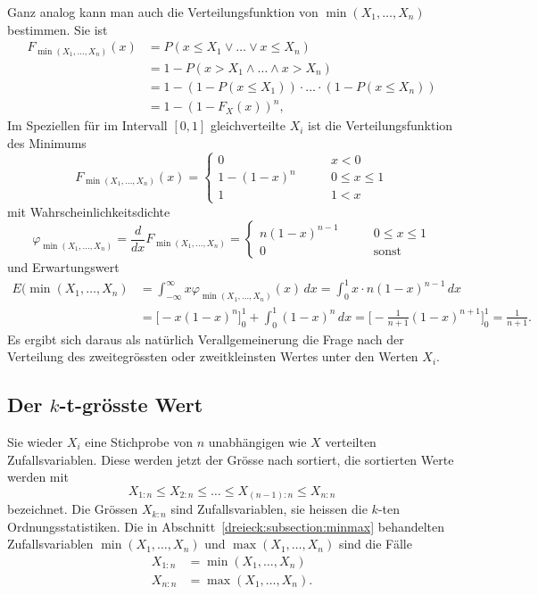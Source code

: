 Ganz analog kann man auch die Verteilungsfunktion von
$\operatorname{min}(X_1,\dots,X_n)$ bestimmen.
Sie ist
\begin{align*}
F_{\operatorname{min}(X_1,\dots,X_n)}(x)
&=
P(x\le X_1\vee \dots \vee x\le X_n)
\\
&=
1-
P(x > X_1\wedge \dots \wedge x > X_n)
\\
&=
1-
(1-P(x\le X_1)) \cdot\ldots\cdot (1-P(x\le X_n))
\\
&=
1-(1-F_X(x))^n,
\end{align*}
Im Speziellen für im Intervall $[0,1]$ gleichverteilte $X_i$ ist die
Verteilungsfunktion des Minimums
\[
F_{\operatorname{min}(X_1,\dots,X_n)}(x)
=
\begin{cases}
0        &\qquad x<0        \\
1-(1-x)^n&\qquad 0\le x\le 1\\
1        &\qquad 1 < x
\end{cases}
\]
mit Wahrscheinlichkeitsdichte
\[
\varphi_{\operatorname{min}(X_1,\dots,X_n)}
=
\frac{d}{dx}
F_{\operatorname{min}(X_1,\dots,X_n)}
=
\begin{cases}
n(1-x)^{n-1}&\qquad 0\le x\le 1\\
0           &\qquad \text{sonst}
\end{cases}
\]
und Erwartungswert
\begin{align*}
E(\operatorname{min}(X_1,\dots,X_n)
&=
\int_{-\infty}^\infty x\varphi_{\operatorname{min}(X_1,\dots,X_n)}(x)\,dx
=
\int_0^1 x\cdot n(1-x)^{n-1}\,dx
\\
&=
\bigl[ -x(1-x)^n \bigr]_0^1 + \int_0^1 (1-x)^n\,dx
=
\biggl[
-
\frac{1}{n+1}
(1-x)^{n+1}
\biggr]_0^1
=
\frac{1}{n+1}.
\end{align*}
Es ergibt sich daraus als natürlich Verallgemeinerung die Frage nach
der Verteilung des zweitegrössten oder zweitkleinsten Wertes unter den
Werten $X_i$.

\subsection{Der $k$-t-grösste Wert}
Sie wieder $X_i$ eine Stichprobe von $n$ unabhängigen wie $X$ verteilten
Zufallsvariablen.
Diese werden jetzt der Grösse nach sortiert, die sortierten Werte werden
mit
\[
X_{1:n} \le X_{2:n} \le \dots \le X_{(n-1):n} \le X_{n:n}
\]
bezeichnet.
Die Grössen $X_{k:n}$ sind Zufallsvariablen, sie heissen die $k$-ten
Ordnungsstatistiken.
Die in Abschnitt~\ref{dreieck:subsection:minmax} behandelten Zufallsvariablen
$\operatorname{min}(X_1,\dots,X_n)$
und
$\operatorname{max}(X_1,\dots,X_n)$
sind die Fälle
\begin{align*}
X_{1:n} &= \operatorname{min}(X_1,\dots,X_n) \\
X_{n:n} &= \operatorname{max}(X_1,\dots,X_n).
\end{align*}

